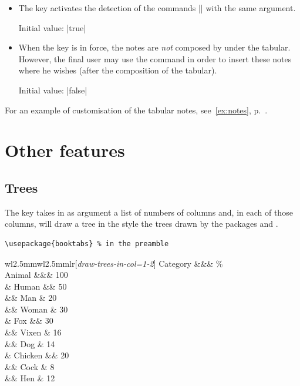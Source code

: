\documentclass[dvipsnames]{article}
\begin{document}
\begin{itemize}[itemsep=\medskipamount,beginpenalty=10000]
\item The key  activates the detection of
the commands |\tabularnotes| with the same argument.

Initial value: |true|

\item {}
When the key  is in force, the notes are \emph{not} composed
by  under the tabular. However, the final user may use the
command  in order to insert these notes where he wishes
(after the composition of the tabular).

Initial value: |false|
\end{itemize}


\bigskip
For an example of customisation of the tabular notes,
see~\ref{ex:notes}, p.~\pageref{ex:notes}.


\section{Other features}


\subsection{Trees}



The key  takes in as argument a list of
numbers of columns and, in each of those columns, will draw a tree
in the style the trees drawn by the packages  and .

\medskip
\begin{Verbatim}[formatcom=\footnotesize \color{gray}]
\usepackage{booktabs} % in the preamble
\end{Verbatim}

\begin{Code}
\renewcommand{\arraystretch}{1.3}
\begin{NiceTabular}{w{l}{2.5mm}w{l}{2.5mm}lr}[\emph{draw-trees-in-col=1-2}]
\toprule
  Category &&&  \% \\
\midrule
  Animal   &&& 100 \\
  & Human   &&  50 \\
  && Man     &  20 \\
  && Woman   &  30 \\
  & Fox     &&  30 \\
  && Vixen   &  16 \\
  && Dog     &  14 \\
  & Chicken &&  20 \\
  && Cock    &   8 \\
  && Hen     &  12 \\
\bottomrule
\end{NiceTabular}
\end{Code}
\end{document}
